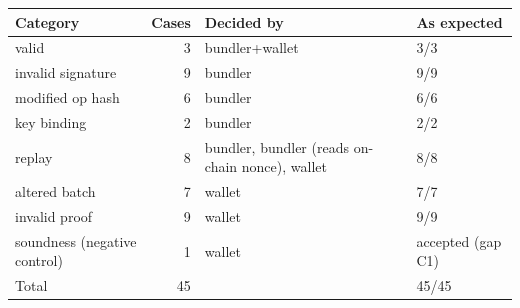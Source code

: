 \begin{tabular}{p{2.3cm}rp{3.6cm}l}
\toprule
Category & Cases & Decided by & As expected \\
\midrule
valid & 3 & bundler+wallet & 3/3 \\
invalid signature & 9 & bundler & 9/9 \\
modified op hash & 6 & bundler & 6/6 \\
key binding & 2 & bundler & 2/2 \\
replay & 8 & bundler, bundler (reads on-chain nonce), wallet & 8/8 \\
altered batch & 7 & wallet & 7/7 \\
invalid proof & 9 & wallet & 9/9 \\
soundness (negative control) & 1 & wallet & accepted (gap C1) \\
\midrule
Total & 45 & & 45/45 \\
\bottomrule
\end{tabular}

